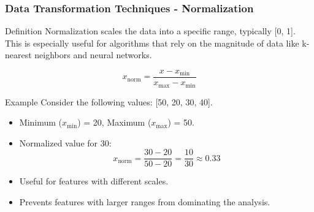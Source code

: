 \documentclass[aspectratio=169]{beamer}
\begin{document}
\begin{frame}[fragile]
    \frametitle{Data Transformation Techniques - Normalization}
    \begin{block}{Definition}
        Normalization scales the data into a specific range, typically [0, 1]. This is especially useful for algorithms that rely on the magnitude of data like k-nearest neighbors and neural networks.
    \end{block}
    
    \begin{equation}
        x_{\text{norm}} = \frac{x - x_{\text{min}}}{x_{\text{max}} - x_{\text{min}}}
    \end{equation}
    
    \begin{block}{Example}
        Consider the following values: [50, 20, 30, 40].
        \begin{itemize}
            \item Minimum ($x_{\text{min}}$) = 20, Maximum ($x_{\text{max}}$) = 50.
            \item Normalized value for 30:
            \begin{equation}
                x_{\text{norm}} = \frac{30 - 20}{50 - 20} = \frac{10}{30} \approx 0.33
            \end{equation}
        \end{itemize}
    \end{block}
    
    \begin{itemize}
        \item Useful for features with different scales.
        \item Prevents features with larger ranges from dominating the analysis.
    \end{itemize}
\end{frame}
\end{document}
